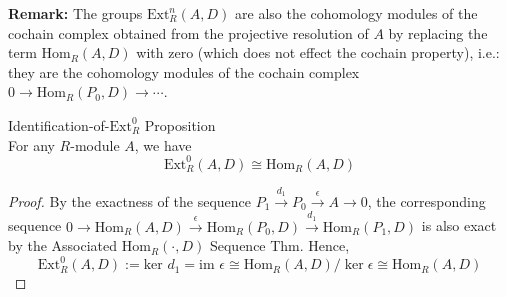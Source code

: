 \noindent\textbf{Remark:} The groups $\text{Ext}_R^n (A,D)$ are also the cohomology modules of the cochain complex obtained from the projective resolution of $A$ by replacing the term $\text{Hom}_R (A,D)$ with zero (which does not effect the cochain property), i.e.: they are the cohomology modules of the cochain complex $0\to \text{Hom}_R (P_0,D) \to \cdots$.

\begin{proposition}{Identification-of-$\text{Ext}_R^0$ Proposition}\\
For any $R$-module $A$, we have
\[
\text{Ext}_R^0 (A,D) \cong \text{Hom}_R (A,D)
\]
\end{proposition}

\begin{proof}
    By the exactness of the sequence $P_1 \xrightarrow{d_1} P_0 \xrightarrow{\epsilon} A\to 0$, the corresponding sequence $0 \to \text{Hom}_R (A,D) \xrightarrow{\epsilon} \text{Hom}_R (P_0,D) \xrightarrow{d_1} \text{Hom}_R (P_1,D)$ is also exact by the Associated $\text{Hom}_R (\cdot, D)$ Sequence Thm. Hence,
    \[
    \text{Ext}_R^0 (A,D) := \text{ker } d_1= \text{im }\epsilon \cong \text{Hom}_R (A,D)/ \ker \epsilon \cong \text{Hom}_R (A,D)
    \]
\end{proof}


